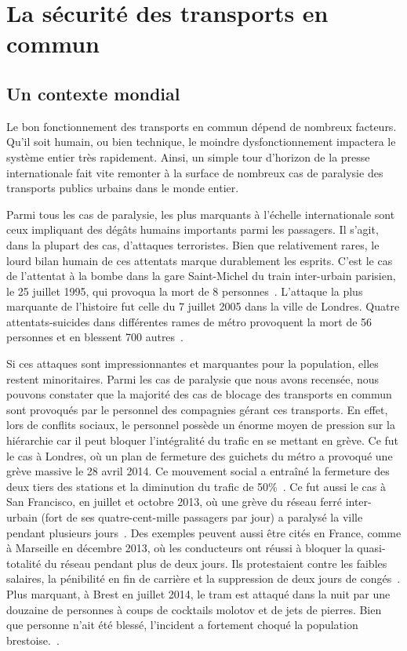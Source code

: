 \section{La sécurité des transports en commun}
    \subsection{Un contexte mondial}
        Le bon fonctionnement des transports en commun dépend de nombreux facteurs. Qu'il soit humain, ou bien technique, le moindre dysfonctionnement impactera le système entier très rapidement. Ainsi, un simple tour d'horizon de la presse internationale fait vite remonter à la surface de nombreux cas de paralysie des transports publics urbains dans le monde entier. 
             
        Parmi tous les cas de paralysie, les plus marquants à l'échelle internationale sont ceux impliquant des dégâts humains importants parmi les passagers. Il s'agit, dans la plupart des cas, d'attaques terroristes. Bien que relativement rares, le lourd bilan humain de ces attentats marque durablement les esprits.  C'est le cas de l'attentat à la bombe dans la gare Saint-Michel du train inter-urbain parisien, le 25 juillet 1995, qui provoqua la mort de 8 personnes~\cite{stmichel}. L'attaque la plus marquante de l'histoire fut celle du 7 juillet 2005 dans la ville de Londres. Quatre attentats-suicides dans différentes rames de métro provoquent la mort de 56 personnes et en blessent 700 autres~\cite{london_attacks}.
        
        Si ces attaques sont impressionnantes et marquantes pour la population, elles restent minoritaires. Parmi les cas de paralysie que nous avons recensée, nous pouvons constater que la majorité des cas de blocage des transports en commun sont provoqués par le personnel des compagnies gérant ces transports. En effet, lors de conflits sociaux, le personnel possède un énorme moyen de pression sur la hiérarchie car il peut bloquer l'intégralité du trafic en se mettant en grève.  Ce fut le cas à Londres, où un plan de fermeture des guichets du métro a provoqué une grève massive le 28 avril 2014. Ce mouvement social a entraîné la fermeture des deux tiers des stations et la diminution du trafic de 50\%~\cite{tubeApril}. Ce fut aussi le cas à San Francisco, en juillet et octobre 2013, où une grève du réseau ferré inter-urbain (fort de ses quatre-cent-mille passagers par jour) a paralysé la ville pendant plusieurs jours~\cite{SFbart}. Des exemples peuvent aussi être cités en France, comme à Marseille en décembre 2013, où les conducteurs ont réussi à bloquer la quasi-totalité du réseau pendant plus de deux jours. Ils protestaient contre les faibles salaires, la pénibilité en fin de carrière et la suppression de deux jours de congés~\cite{greve_marseille}. Plus marquant, à Brest en juillet 2014, le tram est attaqué dans la  nuit par une douzaine de personnes à coups de cocktails molotov et de jets de pierres. Bien que personne n'ait été blessé, l'incident a fortement choqué la population brestoise.~\cite{molotov}.
            
